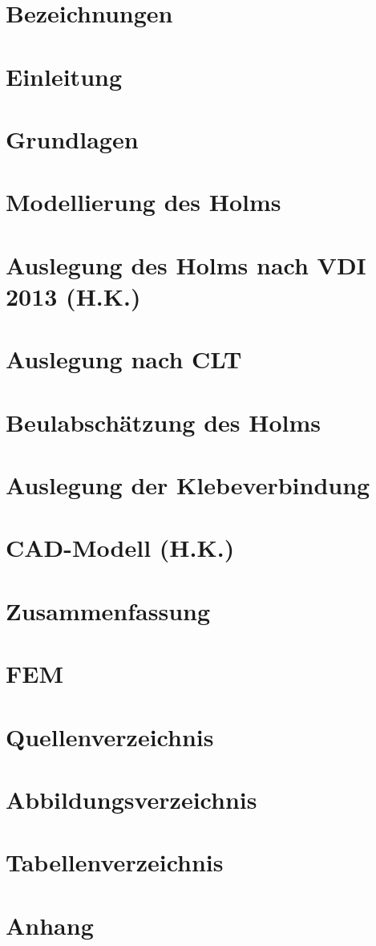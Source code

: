 \documentclass[a4paper,twoside,11pt]{article}
\begin{document}

\newpage

\newpage

\newpage
\tableofcontents
\newpage
\section{Bezeichnungen}

\newpage
\section{Einleitung}

\newpage
\section{Grundlagen}

\newpage
\section{Modellierung des Holms}

\newpage
\section{Auslegung des Holms nach VDI 2013 (H.K.)}

\newpage
\section{Auslegung nach CLT}

\newpage
\section{Beulabschätzung des Holms}

\newpage
\section{Auslegung der Klebeverbindung}

\newpage
\section{CAD-Modell (H.K.)}

\newpage
\section{Zusammenfassung}

\newpage
\section{FEM}

\newpage
\section{Quellenverzeichnis}

\newpage
\section{Abbildungsverzeichnis}
\listoffigures
\newpage
\section{Tabellenverzeichnis}
\listoftables
\newpage
\section{Anhang}

\end{document}
